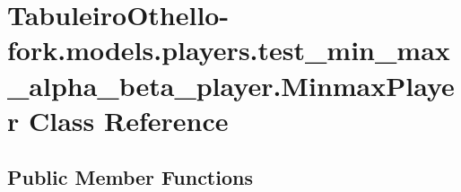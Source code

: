 \hypertarget{class_tabuleiro_othello-fork_1_1models_1_1players_1_1test__min__max__alpha__beta__player_1_1_minmax_player}{}\section{Tabuleiro\+Othello-\/fork.models.\+players.\+test\+\_\+min\+\_\+max\+\_\+alpha\+\_\+beta\+\_\+player.\+Minmax\+Player Class Reference}
\label{class_tabuleiro_othello-fork_1_1models_1_1players_1_1test__min__max__alpha__beta__player_1_1_minmax_player}
\subsection*{Public Member Functions}
